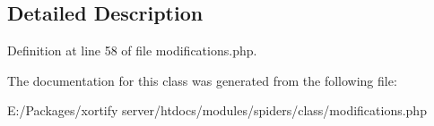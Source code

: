 \subsection{Detailed Description}


Definition at line 58 of file modifications.\-php.



The documentation for this class was generated from the following file\-:\begin{DoxyCompactItemize}
\item 
E\-:/\-Packages/xortify server/htdocs/modules/spiders/class/modifications.\-php\end{DoxyCompactItemize}

